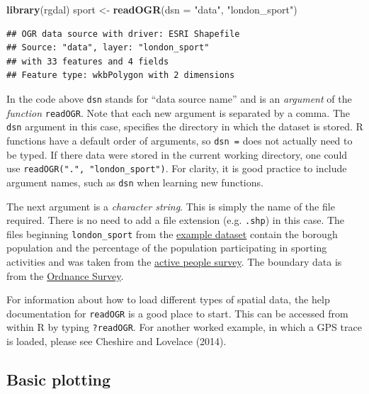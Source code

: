 \documentclass[]{article}
\newenvironment{Shaded}{}{}
\newcommand{\KeywordTok}[1]{\textcolor[rgb]{0.00,0.44,0.13}{\textbf{{#1}}}}
\newcommand{\DataTypeTok}[1]{\textcolor[rgb]{0.56,0.13,0.00}{{#1}}}
\newcommand{\StringTok}[1]{\textcolor[rgb]{0.25,0.44,0.63}{{#1}}}
\newcommand{\NormalTok}[1]{{#1}}
\begin{document}
\begin{Shaded}
\begin{Highlighting}[]
\KeywordTok{library}\NormalTok{(rgdal)}
\NormalTok{sport <- }\KeywordTok{readOGR}\NormalTok{(}\DataTypeTok{dsn =} \StringTok{"data"}\NormalTok{, }\StringTok{"london_sport"}\NormalTok{)}
\end{Highlighting}
\end{Shaded}
\begin{verbatim}
## OGR data source with driver: ESRI Shapefile 
## Source: "data", layer: "london_sport"
## with 33 features and 4 fields
## Feature type: wkbPolygon with 2 dimensions
\end{verbatim}
In the code above \texttt{dsn} stands for ``data source name'' and is an
\emph{argument} of the \emph{function} \texttt{readOGR}. Note that each
new argument is separated by a comma. The \texttt{dsn} argument in this
case, specifies the directory in which the dataset is stored. R
functions have a default order of arguments, so \texttt{dsn =} does not
actually need to be typed. If there data were stored in the current
working directory, one could use \texttt{readOGR(".", "london\_sport")}.
For clarity, it is good practice to include argument names, such as
\texttt{dsn} when learning new functions.

The next argument is a \emph{character string}. This is simply the name
of the file required. There is no need to add a file extension (e.g.
\texttt{.shp}) in this case. The files beginning \texttt{london\_sport}
from the
\href{http://spatial.ly/wp-content/uploads/2013/12/spatialggplot.zip}{example
dataset} contain the borough population and the percentage of the
population participating in sporting activities and was taken from the
\href{http://data.london.gov.uk/datastore/package/active-people-survey-kpi-data-borough}{active
people survey}. The boundary data is from the
\href{http://www.ordnancesurvey.co.uk/oswebsite/opendata/}{Ordnance
Survey}.

For information about how to load different types of spatial data, the
help documentation for \texttt{readOGR} is a good place to start. This
can be accessed from within R by typing \texttt{?readOGR}. For another
worked example, in which a GPS trace is loaded, please see Cheshire and
Lovelace (2014).

\subsection{Basic plotting}
\end{document}

